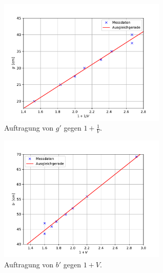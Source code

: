 \begin{figure}[h]
    \centering
    \includegraphics[height=6cm]{Auswertung/Abbe1.pdf}
    \caption{Auftragung von $g'$ gegen $1+\frac{1}{V}$.}
    \label{fig:abbe1}
\end{figure}
\begin{figure}[h]
    \centering
    \includegraphics[height=6cm]{Auswertung/Abbe2.pdf}
    \caption{Auftragung von $b'$ gegen $1+V$.}
    \label{fig:abbe2}
\end{figure}
